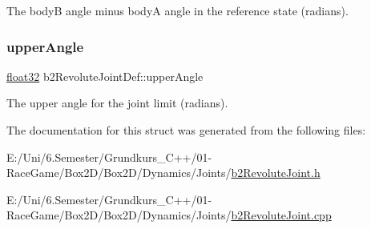 The bodyB angle minus bodyA angle in the reference state (radians). 

\mbox{\label{structb2_revolute_joint_def_a692cfe333ad12afd5753a6ec54e39a66}} 
\subsubsection{\texorpdfstring{upperAngle}{upperAngle}}
{\footnotesize\ttfamily \mbox{\hyperlink{b2_settings_8h_aacdc525d6f7bddb3ae95d5c311bd06a1}{float32}} b2\+Revolute\+Joint\+Def\+::upper\+Angle}



The upper angle for the joint limit (radians). 



The documentation for this struct was generated from the following files\+:\begin{DoxyCompactItemize}
\item 
E\+:/\+Uni/6.\+Semester/\+Grundkurs\+\_\+\+C++/01-\/\+Race\+Game/\+Box2\+D/\+Box2\+D/\+Dynamics/\+Joints/\mbox{\hyperlink{b2_revolute_joint_8h}{b2\+Revolute\+Joint.\+h}}\item 
E\+:/\+Uni/6.\+Semester/\+Grundkurs\+\_\+\+C++/01-\/\+Race\+Game/\+Box2\+D/\+Box2\+D/\+Dynamics/\+Joints/\mbox{\hyperlink{b2_revolute_joint_8cpp}{b2\+Revolute\+Joint.\+cpp}}\end{DoxyCompactItemize}
